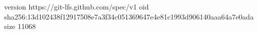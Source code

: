 version https://git-lfs.github.com/spec/v1
oid sha256:13d102438f12917508e7a3f34c051369647e4e81c1993d906140aaa64a7e0ada
size 11068
